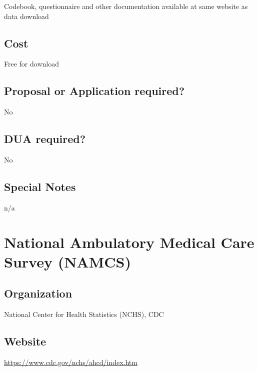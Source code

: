 \documentclass[
]{book}
\begin{document}
Codebook, questionnaire and other documentation available at same website as data download

\hypertarget{cost-41}{%
\section{Cost}\label{cost-41}}

Free for download

\hypertarget{proposal-or-application-required-41}{%
\section{Proposal or Application required?}\label{proposal-or-application-required-41}}

No

\hypertarget{dua-required-41}{%
\section{DUA required?}\label{dua-required-41}}

No

\hypertarget{special-notes-41}{%
\section{Special Notes}\label{special-notes-41}}

n/a

\mainmatter

\hypertarget{national-ambulatory-medical-care-survey-namcs}{%
\chapter{National Ambulatory Medical Care Survey (NAMCS)}\label{national-ambulatory-medical-care-survey-namcs}}

\hypertarget{organization-42}{%
\section{Organization}\label{organization-42}}

National Center for Health Statistics (NCHS), CDC

\hypertarget{website-42}{%
\section{Website}\label{website-42}}

\url{https://www.cdc.gov/nchs/ahcd/index.htm}
\end{document}
